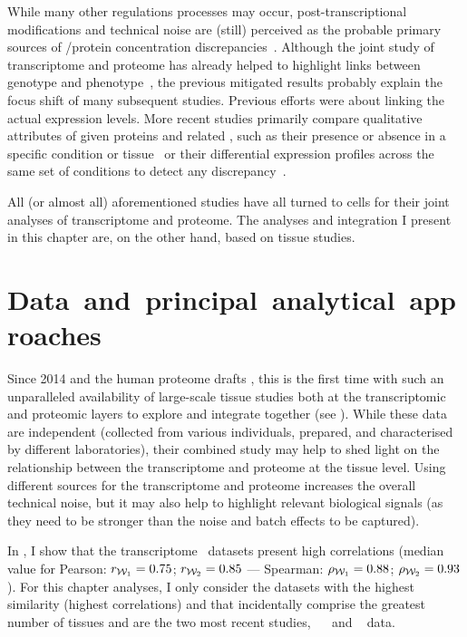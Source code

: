 While many other regulations processes may occur,
post-transcriptional modifications and technical noise
are (still) perceived as the probable primary sources
of \mRNA/protein concentration discrepancies~.
Although
the joint study of transcriptome and proteome has already helped to highlight
links between genotype and phenotype~,
the previous mitigated results probably explain the focus shift of
many subsequent studies.
Previous efforts were about linking the actual expression levels.
More recent studies primarily compare qualitative attributes
of given proteins and related \mRNAs,
such as their presence or absence in a specific condition
or tissue~
or their differential expression profiles across the same set of conditions
to detect any discrepancy~.

All (or almost all) aforementioned studies have all turned to cells
for their joint analyses of transcriptome and proteome.
The analyses and integration I present in this chapter are,
on the other hand, based on tissue studies.

\vspace{-2mm}
\section{Data~and~principal~analytical~approaches}\label{sec:IntegrationData}
\vspace{-4mm}
Since 2014 and the human proteome drafts ,
this is the first time with such
an unparalleled availability of large-scale tissue studies
both at the transcriptomic and proteomic layers to explore and integrate together
(see ).
While these data are independent
(collected from various individuals, prepared,
and characterised by different laboratories),
their combined study may help
to shed light on the relationship
between the transcriptome and proteome at the tissue level.
Using different sources for the transcriptome and proteome
increases the overall technical noise,
but it may also help to highlight relevant biological signals (as
they need to be stronger than the noise and batch effects to be captured).

In , I show that
the transcriptome \Rnaseq\ datasets present high correlations
(median value for Pearson: $r_{\mathcal{W}_1}=0.75$; $r_{\mathcal{W}_2}=0.85$ ---
Spearman: $\rho_{\mathcal{W}_1}=0.88$; $\rho_{\mathcal{W}_2}=0.93$).
For this chapter analyses,
I only consider the datasets with the highest similarity
(highest correlations) and
that incidentally comprise the greatest number of tissues
and are the two most recent studies,
\ie\ ~
and ~ data.\\
\vspace{-\baselineskip}

